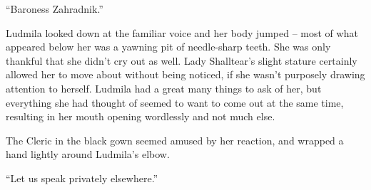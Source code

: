 “Baroness Zahradnik.”

 

Ludmila looked down at the familiar voice and her body jumped – most of what appeared below her was a yawning pit of needle-sharp teeth. She was only thankful that she didn’t cry out as well. Lady Shalltear’s slight stature certainly allowed her to move about without being noticed, if she wasn’t purposely drawing attention to herself. Ludmila had a great many things to ask of her, but everything she had thought of seemed to want to come out at the same time, resulting in her mouth opening wordlessly and not much else.

 

The Cleric in the black gown seemed amused by her reaction, and wrapped a hand lightly around Ludmila’s elbow.

 

“Let us speak privately elsewhere.”